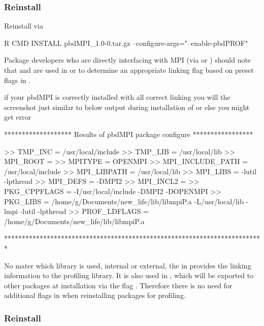 \subsubsection{Reinstall }
\label{sec:pbdMPI}

Reinstall  via
\begin{Command}
R CMD INSTALL pbdMPI_1.0-0.tar.gz --configure-args="--enable-pbdPROF"
\end{Command}
Package developers who are directly interfacing with MPI (via  or ) 
should note that  and  are
used in  or  to determine an
appropriate linking flag  based on preset flags in
.

if your pbdMPI is correctly installed with all correct linking you will the screenshot just similar to below output 
during installation of  or else you might get error 
\begin{Output}
******************* Results of pbdMPI package configure *****************
 
>> TMP_INC = /usr/local/include
>> TMP_LIB = /usr/local/lib
>> MPI_ROOT = 
>> MPITYPE = OPENMPI
>> MPI_INCLUDE_PATH = /usr/local/include
>> MPI_LIBPATH = /usr/local/lib
>> MPI_LIBS =  -lutil -lpthread
>> MPI_DEFS = -DMPI2
>> MPI_INCL2 = 
>> PKG_CPPFLAGS = -I/usr/local/include  -DMPI2 -DOPENMPI
>> PKG_LIBS = /home/g/Documents/new_life/lib/libmpiP.a -L/usr/local/lib -lmpi  -lutil -lpthread
>> PROF_LDFLAGS = /home/g/Documents/new_life/lib/libmpiP.a
 
*************************************************************************

\end{Output}

No mater which library is used, internal or external, the 
in  provides the linking information to the
profiling library. It is also used in , which will be
exported to other  packages at installation via the flag
.  Therefore there is no need for additional flags in
 when reinstalling packages for profiling.


\subsubsection{Reinstall }
\label{sec:pbdBASE}

